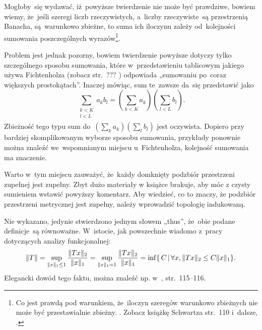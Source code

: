 \documentclass[a4paper,11pt]{article}
\begin{document}
Mogłoby~się wydawać, iż~powyższe twierdzenie nie może być prawdziwe,
bowiem wiemy, że~jeśli szeregi liczb rzeczywistych, a~liczby
rzeczywiste~są przestrzenią Banacha, są~warunkowo zbieżne, to suma ich
iloczynu zależy od~kolejności sumowania poszczególnych
wyrazów\footnote{Co jest prawdą pod warunkiem, że~iloczyn szeregów
  warunkowo zbieżnych nie może być przestawialnie zbieżny. \Dok.
  Zobacz książkę Schwartza str.~110 i~dalsze,
  \cite{SchwartzKursAnalizyMatematycznejVolI1979}.}.

Problem jest jednak pozorny, bowiem twierdzenie powyższe dotyczy tylko
szczególnego sposobu sumowania, które w~przedstawieniu tablicowym
jakiego używa Fichtenholza (zobacz str.~???
\cite{FichtenholzRachunekRozniczkowyETCVolII2004})
odpowiada „sumowaniu po~coraz większych prostokątach”. Inaczej
mówiąc, sum te~zawsze da~się przedstawić jako
\begin{equation}
  \label{eq:RS-Vol-I-s02-07}
  \sum_{ \substack{ k < K \\ l < L \\ } } a_{ k } b_{ l }
  = ( \sum_{ k < K } a_{ k } ) ( \sum_{ l < L } b_{ l } ).
\end{equation}
Zbieżność tego typu sum
do~$( \sum_{ k } a_{ k } ) ( \sum_{ l } b_{ l } )$ jest oczywista.
Dopiero przy bardziej skomplikowanym wyborze sposobu sumowania,
przykłady ponownie można znaleźć we~wspomnianym miejscu
u~Fichtenholza, kolejność sumowania ma znaczenie. %

\vspace{\spaceTwo}







\start {} Warto w~tym miejscu zauważyć, że~każdy domknięty
podzbiór przestrzeni zupełnej jest zupełny. Zbyt dużo materiały w
książce brakuje, aby móc z czysty sumieniem wstawić powyższy
komentarz. Aby wiedzieć, co to znaczy, że podzbiór przestrzeni
metrycznej jest zupełny, należy wprowadzić topologię indukowaną.


\start {} Nie wykazano, jedynie stwierdzono jednym słowem
„thus”, że~obie podane definicje~są równoważne. W~istocie, jak
powszechnie wiadomo z~pracy dotyczących analizy funkcjonalnej:
\begin{equation}
  \label{eq:RS-Vol-I-s01-12}
  \lVert{  T  }\rVert =
  \sup_{ \lVert{  x  }\rVert_{ 1 } \leq 1 } \frac{ \lVert{  T x  }\rVert_{ 2 } }{ \lVert{  x  }\rVert_{ 1 } }
  =
  \sup_{ \lVert{  x  }\rVert_{ 1 } = 1 }
  \frac{ \lVert{  T x  }\rVert_{ 2 } }{ \lVert{  x  }\rVert_{ 1 } }
  = \inf \{ \, C \, | \, \forall x, \lVert{  T x  }\rVert_{ 2 } \leq C \lVert{  x  }\rVert_{ 1 } \}.
\end{equation}
Elegancki dowód tego faktu, można znaleźć np.
w~\cite{ChmielinskiAnalizaFunkcjonalna2004},
str.~115--116. %
\end{document}
